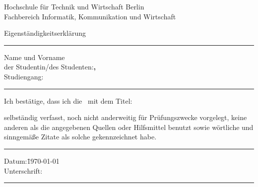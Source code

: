 %

\thispagestyle{empty}				%
\begin{minipage}{0.65\textwidth}
  Hochschule für Technik und Wirtschaft Berlin\\
  Fachbereich Informatik, Kommunikation und Wirtschaft\\[1.5cm]
\end{minipage}

Eigenständigkeitserklärung\\
\rule[1ex]{\textwidth}{0.5pt}
\vspace*{0.5cm}
\begin{tabbing}
  Name und Vorname\\
  der Studentin/des Studenten:\qquad\=\textbf{\IhrNachname, \IhrVorname}\\[1cm]
  Studiengang:                      \>\textbf{\IhrStudiengang}
\end{tabbing}
\rule[1ex]{\textwidth}{0.5pt}
\vspace*{0.5cm}
Ich bestätige, dass ich die \IhreArbeit\ mit dem Titel:
\begin{center}
  \textbf{\IhrTitelDE}
\end{center}
\vspace*{0.5cm}
selbständig verfasst, noch nicht anderweitig für Prüfungszwecke vorgelegt, keine anderen als die angegebenen Quellen oder Hilfsmittel benutzt sowie wörtliche und sinngemäße Zitate als solche gekennzeichnet habe.\\[0.5cm]
\rule[1ex]{\textwidth}{0.5pt}
\begin{tabbing}
  Datum:\hspace{2cm}\=\today\\[1cm]
  Unterschrift:\> 
\end{tabbing}
\rule[1ex]{\textwidth}{0.5pt}
\clearpage